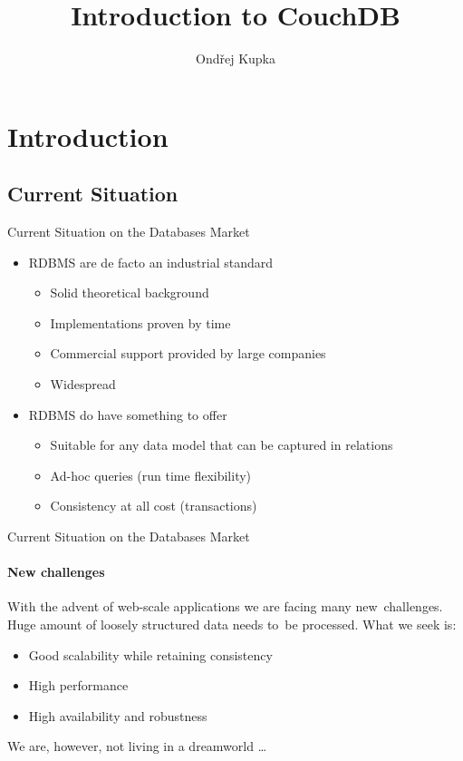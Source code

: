 \documentclass{beamer}
\title{Introduction to CouchDB}
\author{Ondřej Kupka}
\begin{document}
\begin{frame}
\titlepage
\end{frame}

\section{Introduction}
\subsection{Current Situation}
\begin{frame}{Current Situation on the Databases Market}
  \begin{itemize}
    \item RDBMS are de facto an industrial standard
    \begin{itemize}
      \item Solid theoretical background
      \item Implementations proven by time
      \item Commercial support provided by large companies
      \item Widespread
    \end{itemize}
    \item RDBMS do have something to offer
    \begin{itemize}
      \item Suitable for any data model that can be captured in relations
      \item Ad-hoc queries (run time flexibility)
      \item Consistency at all cost (transactions)
    \end{itemize}
  \end{itemize}
\end{frame}

\begin{frame}{Current Situation on the Databases Market}
  \framesubtitle{New challenges}
  With the advent of web-scale applications we are facing many new~challenges.
  Huge amount of loosely structured data needs to~be processed.
  What we seek is:
  \begin{itemize}
    \item Good scalability while retaining consistency
    \item High performance
    \item High availability and robustness
  \end{itemize}
  We are, however, not living in a dreamworld \ldots
\end{frame}
\end{document}
